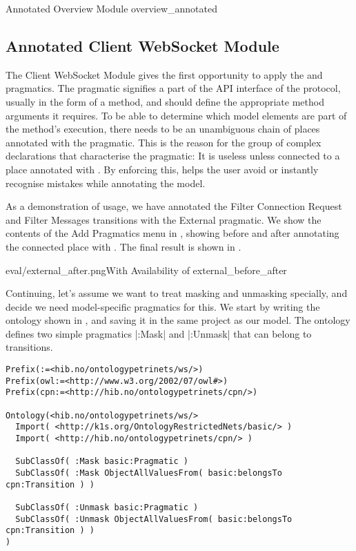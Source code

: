  {Annotated Overview Module}
{overview_annotated}


\subsection{Annotated Client WebSocket Module}

The Client WebSocket Module gives the first opportunity to apply the
 and  pragmatics. The  pragmatic
signifies a part of the API interface of the protocol, usually in the form of a
method, and should define the appropriate method arguments it requires.
To be able to determine which model elements are part of the method's execution,
there needs to be an unambiguous chain of places annotated with the 
pragmatic. This is the reason for the group of complex declarations that
characterise the  pragmatic: It is useless unless connected to
a place annotated with . By enforcing this, \thename{} helps the
user avoid or instantly recognise mistakes while annotating the model. 


As a demonstration of usage, we have annotated the Filter Connection Request and
Filter Messages transitions with the External pragmatic. We show the contents
of the Add Pragmatics menu in , showing before and
after annotating the connected place with . The final result is shown
in .

{eval/external_after.png}{With }
{Availability of }{external_before_after}


Continuing, let's assume we want to treat masking and unmasking specially, and
decide we need model-specific pragmatics for this. We start by writing the ontology shown
in , and saving it in the same project as our model. The
ontology defines two simple pragmatics |:Mask| and |:Unmask| that can belong to
transitions.


\begin{lstlisting}[label=lst:ws_ontology,float,
caption=WebSocket Masking Pragmatics]
Prefix(:=<hib.no/ontologypetrinets/ws/>)
Prefix(owl:=<http://www.w3.org/2002/07/owl#>)
Prefix(cpn:=<http://hib.no/ontologypetrinets/cpn/>)

Ontology(<hib.no/ontologypetrinets/ws/>
  Import( <http://k1s.org/OntologyRestrictedNets/basic/> )
  Import( <http://hib.no/ontologypetrinets/cpn/> )
  
  SubClassOf( :Mask basic:Pragmatic )
  SubClassOf( :Mask ObjectAllValuesFrom( basic:belongsTo cpn:Transition ) )
  
  SubClassOf( :Unmask basic:Pragmatic )
  SubClassOf( :Unmask ObjectAllValuesFrom( basic:belongsTo cpn:Transition ) )
)
\end{lstlisting}

